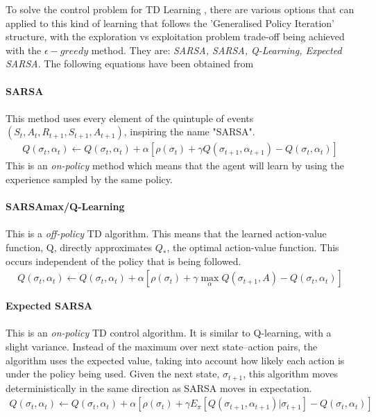 \documentclass[ %
                    author={Ashwinder Khurana},
                supervisor={Prof Dave Cliff},
                    degree={MEng},
                     title={The Deeply Reinforced Trader},
                  subtitle={},
                      type={enterprise},
                      year={2020} ]{dissertation}
\begin{document}
{\noindent 
To solve the control problem for TD Learning , there are various options that can applied to this kind of learning that follows the 'Generalised Policy Iteration' structure, with the exploration vs exploitation problem trade-off being achieved with the $\epsilon-greedy$ method. They are: \textit{SARSA, SARSA, Q-Learning, Expected SARSA}. The following equations have been obtained from \cite{https://www.cellstrat.com/2020/04/27/temporal-difference-methods/} 
\\
\\
\textbf{SARSA}
\\
\\
This method uses every element of the quintuple of events $(S_t, A_t, R_{t+1}, S_{t+1}, A_{t+1})$, inspiring the name "SARSA". 
\begin{equation}
\label{SARSA}
\begin{split}
Q(\sigma_t, \alpha_t) \leftarrow Q(\sigma_t, \alpha_t) + \alpha[\rho(\sigma_t) + \gamma Q(\sigma_{t+1}, \alpha_{t+1}) - Q(\sigma_t, \alpha_t)]
\end{split}
\end{equation}
\noindent
This is an \textit{on-policy} method which means that the agent will learn by using the experience sampled by the same policy. 
\\
\\
\noindent
\textbf{SARSAmax/Q-Learning}
\\
\\
This is a \textit{off-policy} TD algorithm. This means that the learned action-value function, Q, directly approximates $Q_*$, the optimal action-value function. This occurs independent of the policy that is being followed. 
\begin{equation}
\label{Q-learning}
\begin{split}
Q(\sigma_t, \alpha_t) \leftarrow Q(\sigma_t, \alpha_t) + \alpha[\rho(\sigma_t) + \gamma \max\limits^{}_{\alpha}Q(\sigma_{t+1}, A) - Q(\sigma_t, \alpha_t)]
\end{split}
\end{equation}

\noindent
\textbf{Expected SARSA}
\\
\\
This is an \textit{on-policy} TD control algorithm. It is similar to Q-learning, with a slight variance. Instead of the maximum over next state–action pairs,  the algorithm uses the expected value, taking into account how likely each action is under the policy being used. Given the next state, $\sigma_{t+1}$, this algorithm moves deterministically in the same direction as SARSA moves in expectation. 
\begin{equation}
\label{SARSA}
\begin{split}
Q(\sigma_t, \alpha_t) \leftarrow Q(\sigma_t, \alpha_t) + \alpha[\rho(\sigma_t) + \gamma E_\pi[Q(\sigma_{t+1}, \alpha_{t+1}) | \sigma_{t+1}] - Q(\sigma_t, \alpha_t)]
\end{split}
\end{equation}

}
\end{document}
